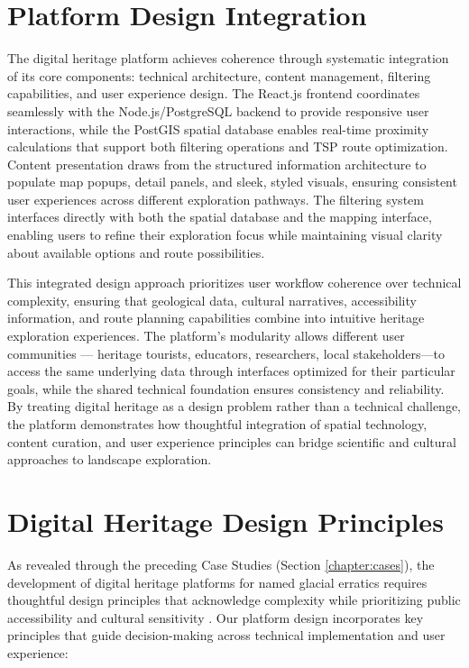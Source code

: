 \section{Platform Design Integration}
\label{sec:integration}

The digital heritage platform achieves coherence through systematic integration of its core components: technical architecture, content management, filtering capabilities, and user experience design. The React.js frontend coordinates seamlessly with the Node.js/PostgreSQL backend to provide responsive user interactions, while the PostGIS spatial database enables real-time proximity calculations that support both filtering operations and TSP route optimization. Content presentation draws from the structured information architecture to populate map popups, detail panels, and sleek, styled visuals, ensuring consistent user experiences across different exploration pathways. The filtering system interfaces directly with both the spatial database and the mapping interface, enabling users to refine their exploration focus while maintaining visual clarity about available options and route possibilities.

This integrated design approach prioritizes user workflow coherence over technical complexity, ensuring that geological data, cultural narratives, accessibility information, and route planning capabilities combine into intuitive heritage exploration experiences. The platform's modularity allows different user communities — heritage tourists, educators, researchers, local stakeholders—to access the same underlying data through interfaces optimized for their particular goals, while the shared technical foundation ensures consistency and reliability. By treating digital heritage as a design problem rather than a technical challenge, the platform demonstrates how thoughtful integration of spatial technology, content curation, and user experience principles can bridge scientific and cultural approaches to landscape exploration.

\section{Digital Heritage Design Principles}
\label{sec:design_principles}

As revealed through the preceding Case Studies (Section \ref{chapter:cases}), the development of digital heritage platforms for named glacial erratics requires thoughtful design principles that acknowledge complexity while prioritizing public accessibility and cultural sensitivity \cite{Gregory2013}. Our platform design incorporates key principles that guide decision-making across technical implementation and user experience:

